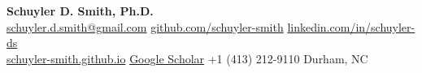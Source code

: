 
\newcommand{\Address}{Durham, NC 27713}
\newcommand{\Phone}{+1-(413)-212-9110}
\newcommand{\EMail}{schuyler.d.smith@gmail.com}
\newcommand{\GitHub}{https://github.com/schuyler-smith}
\newcommand{\LinkedIn}{https://linkedin.com/in/schuyler-ds}
\newcommand{\WebPage}{https://schuyler-smith.github.io/}
\newcommand{\ScholarPage}{https://scholar.google.com/citations?user=fTKo_RgAAAAJ\&hl=en\&oi=sra}

 \noindent
 \textbf{\LARGE Schuyler D. Smith, Ph.D.} \\
 \vspace{0.2cm}
 \faEnvelope\hspace{0.2em} \href{mailto:schuyler.d.smith@gmail.com}{schuyler.d.smith@gmail.com} \quad
 \faGithub\hspace{0.2em} \href{https://github.com/schuyler-smith}{github.com/schuyler-smith} \quad
 \faLinkedin\hspace{0.2em} \href{https://linkedin.com/in/schuyler-ds}{linkedin.com/in/schuyler-ds} \\
 \faGlobe\hspace{0.2em} \href{https://schuyler-smith.github.io/}{schuyler-smith.github.io} \quad
 \aiGoogleScholar\hspace{0.2em} \href{https://scholar.google.com/citations?user=fTKo_RgAAAAJ&hl=en&oi=sra}{Google Scholar} \quad
 \faPhone\hspace{0.2em} +1 (413) 212-9110 \quad
 \faMapMarker\hspace{0.2em} Durham, NC
 


